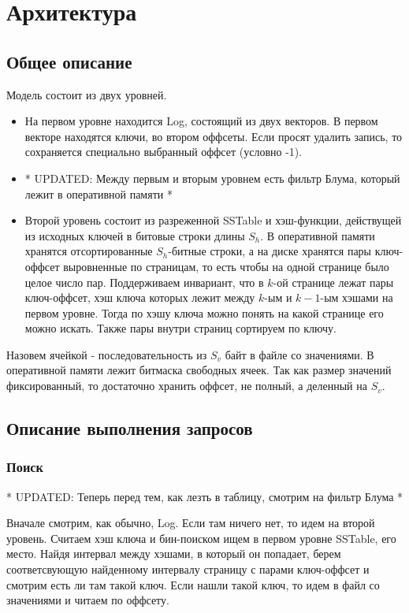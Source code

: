 \section*{Архитектура}
  \subsection*{Общее описание}
      Модель состоит из двух уровней. 
      \begin{itemize} 
      \item 
        На первом уровне находится Log, состоящий из двух векторов. В первом векторе находятся ключи, во втором оффсеты. Если просят удалить запись, то сохраняется специально выбранный оффсет (условно -1).
      \item
        * UPDATED: Между первым и вторым уровнем есть фильтр Блума, который лежит в оперативной памяти *
      \item
        Второй уровень состоит из разреженной SSTable и хэш-функции, действущей из исходных ключей в битовые строки длины $S_h$.
        В оперативной памяти хранятся отсортированные $S_h$-битные строки, а на диске хранятся пары ключ-оффсет выровненные по страницам, 
        то есть чтобы на одной странице было целое число пар. Поддерживаем инвариант, что в $k$-ой странице лежат пары ключ-оффсет, хэш ключа которых лежит между $k$-ым и $k-1$-ым хэшами на первом уровне. 
        Тогда по хэшу ключа можно понять на какой странице его можно искать. Также пары внутри страниц сортируем по ключу.
      \end{itemize}

      Назовем ячейкой - последовательность из $S_v$ байт в файле со значениями. В оперативной памяти лежит битмаска свободных ячеек. 
      Так как размер значений фиксированный, то достаточно хранить оффсет, не полный, а деленный на $S_v$.

    \subsection*{Описание выполнения запросов}
      \subsubsection*{Поиск}
        * UPDATED: Теперь перед тем, как лезть в таблицу, смотрим на фильтр Блума * \par
        Вначале смотрим, как обычно, Log. Если там ничего нет, то идем на второй уровень. 
        Считаем хэш ключа и бин-поиском ищем в первом уровне SSTable, его место. 
        Найдя интервал между хэшами, в который он попадает, берем соответсвующую найденному интервалу страницу с парами ключ-оффсет и смотрим есть ли там такой ключ. 
        Если нашли такой ключ, то идем в файл со значениями и читаем по оффсету.

